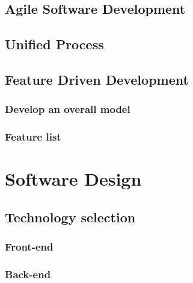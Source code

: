 \documentclass{article}
\begin{document}
    \subsection{Agile Software Development}
    

    \subsection{Unified Process}
    

    \subsection{Feature Driven Development}
    
    
        \subsubsection{Develop an overall model}
        
        
        \subsubsection{Feature list}
        

\pagebreak

\section{Software Design}

    \subsection{Technology selection}
    

            \subsubsection{Front-end}
            
            
            \subsubsection{Back-end}
            
            
\end{document}
